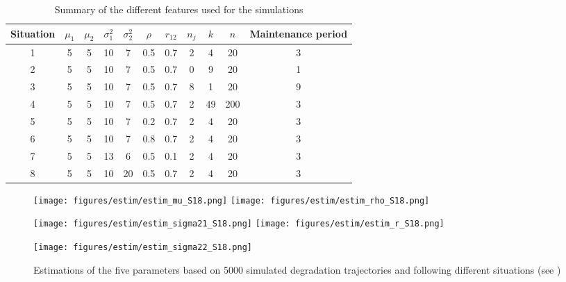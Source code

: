 \begin{table} [!h]
\caption{Summary of the different features used for the simulations}
\centering
\label{table:para}
\begin{tabular}{|c|c|c|c|c|c|c|c|c|c|c|}
\hline
Situation & $\mu_1$ & $\mu_2$ &  $\sigma_1^2$  &  $\sigma_2^2$ & $\rho$ & $r_{12}$ & $n_j$ & $k$ & $n$  & Maintenance period\\
\hline
1& 5&5&10&7&0.5&0.7&2&4&20&3\\
2&5&5&10&7&0.5&0.7&0&9&20&1 \\
3&5&5&10&7&0.5&0.7&8&1&20&9 \\
4&5&5&10&7&0.5&0.7&2&49&200&3 \\
5&5&5&10&7&0.2&0.7&2&4&20&3 \\
6&5&5&10&7&0.8&0.7&2&4&20&3 \\
7&5&5&13&6&0.5&0.1&2&4&20&3 \\
8&5&5&10&20&0.5&0.7&2&4&20&3 \\



\hline
\end{tabular}
\end{table}


\begin{figure}[h!]
\centering
\begin{multicols}{3}
\texttt{[image: figures/estim/estim\_mu\_S18.png]} 
\texttt{[image: figures/estim/estim\_rho\_S18.png]} \\
\columnbreak

\texttt{[image: figures/estim/estim\_sigma21\_S18.png]} 
\texttt{[image: figures/estim/estim\_r\_S18.png]} \\
\columnbreak

\texttt{[image: figures/estim/estim\_sigma22\_S18.png]} \\


\end{multicols}
\caption{Estimations of the five parameters based on 5000 simulated degradation trajectories and following different situations (see )}
\label{estim_para}
\end{figure}

